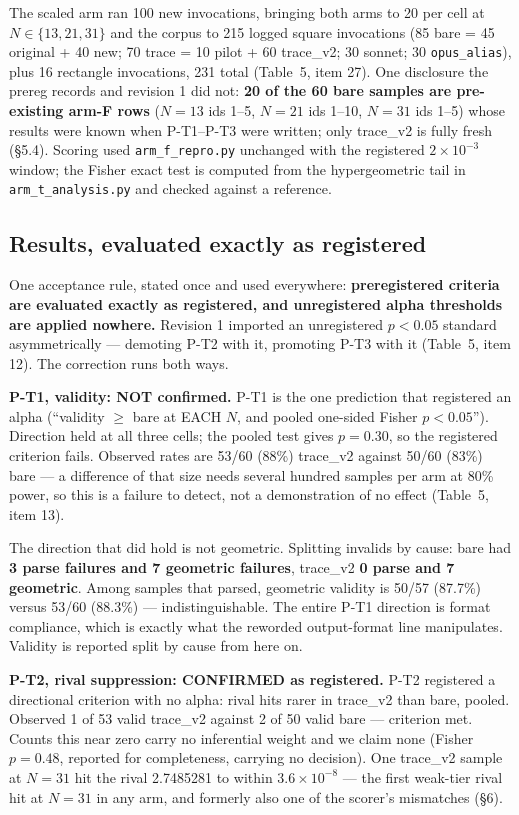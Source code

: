 \documentclass[11pt]{article}
\begin{document}
The scaled arm ran 100 new invocations, bringing both arms to 20 per cell at $N \in \{13, 21, 31\}$
and the corpus to 215 logged square invocations (85 bare = 45 original + 40 new; 70 trace = 10
pilot + 60 trace\_v2; 30 sonnet; 30 \texttt{opus\_alias}), plus 16 rectangle invocations, 231 total
(Table~5, item 27). One disclosure the prereg records and revision 1 did not: \textbf{20 of the 60
bare samples are pre-existing arm-F rows} ($N = 13$ ids 1--5, $N = 21$ ids 1--10, $N = 31$ ids 1--5)
whose results were known when P-T1--P-T3 were written; only trace\_v2 is fully fresh (\S5.4).
Scoring used \texttt{arm\_f\_repro.py} unchanged with the registered $2\times10^{-3}$ window; the Fisher exact test
is computed from the hypergeometric tail in \texttt{arm\_t\_analysis.py} and checked against a reference.

\subsection{Results, evaluated exactly as registered}

One acceptance rule, stated once and used everywhere: \textbf{preregistered criteria are evaluated
exactly as registered, and unregistered alpha thresholds are applied nowhere.} Revision 1
imported an unregistered $p < 0.05$ standard asymmetrically --- demoting P-T2 with it, promoting
P-T3 with it (Table~5, item 12). The correction runs both ways.

\textbf{P-T1, validity: NOT confirmed.} P-T1 is the one prediction that registered an alpha
(``validity $\ge$ bare at EACH $N$, and pooled one-sided Fisher $p < 0.05$''). Direction held at all three
cells; the pooled test gives $p = 0.30$, so the registered criterion fails. Observed rates are
53/60 (88\%) trace\_v2 against 50/60 (83\%) bare --- a difference of that size needs several hundred
samples per arm at 80\% power, so this is a failure to detect, not a demonstration of no effect
(Table~5, item 13).

The direction that did hold is not geometric. Splitting invalids by cause: bare had \textbf{3 parse
failures and 7 geometric failures}, trace\_v2 \textbf{0 parse and 7 geometric}. Among samples that
parsed, geometric validity is 50/57 (87.7\%) versus 53/60 (88.3\%) --- indistinguishable. The
entire P-T1 direction is format compliance, which is exactly what the reworded output-format
line manipulates. Validity is reported split by cause from here on.

\textbf{P-T2, rival suppression: CONFIRMED as registered.} P-T2 registered a directional criterion
with no alpha: rival hits rarer in trace\_v2 than bare, pooled. Observed 1 of 53 valid trace\_v2
against 2 of 50 valid bare --- criterion met. Counts this near zero carry no inferential weight
and we claim none (Fisher $p = 0.48$, reported for completeness, carrying no decision). One
trace\_v2 sample at $N = 31$ hit the rival 2.7485281 to within $3.6\times10^{-8}$ --- the first weak-tier rival
hit at $N = 31$ in any arm, and formerly also one of the scorer's mismatches (\S6).
\end{document}
